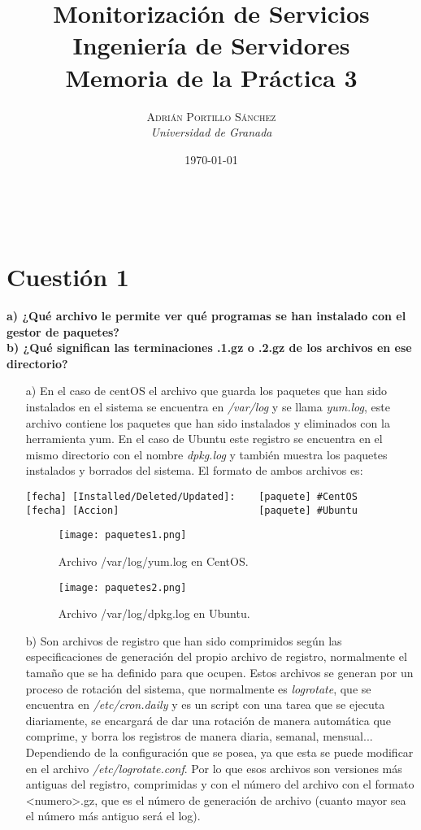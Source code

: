 \documentclass[a4paper, 11pt]{article} %
\title{\textbf{Monitorización de Servicios}\\ %
\vspace{20 pt}
Ingeniería de Servidores \\Memoria de la Práctica 3} %
\author{\textsc{Adrián Portillo Sánchez} %
\\{\textit{Universidad de Granada}}} %
\date{\today} %
\makeatletter
\renewcommand{\maketitle}{ %
\begin{center} %
{\Huge\@title} %
\end{center}

\vspace{20pt} %

\begin{flushright} %
{\large\@author} %
\\\@date %

\vspace{40pt} %
\end{flushright}
}
\makeatother
\begin{document}
\maketitle
\pagebreak
\tableofcontents
\pagebreak
\listoffigures
\pagebreak


\section{Cuestión 1}
\textbf{a) ¿Qué archivo le permite ver qué programas se han instalado con el gestor de paquetes?\\ b) ¿Qué significan las terminaciones .1.gz o .2.gz de los archivos en ese directorio?}\\ 

\begin{itemize}
\item[a)]\cite{1}\cite{2}En el caso de centOS el archivo que guarda los paquetes que han sido instalados en el sistema se encuentra en \textit{/var/log} y se llama \textit{yum.log}, este archivo contiene los paquetes que han sido instalados y eliminados con la herramienta yum. En el caso de Ubuntu este registro se encuentra en el mismo directorio con el nombre \textit{dpkg.log} y también muestra los paquetes instalados y borrados del sistema. El formato de ambos archivos es:
\begin{verbatim}
[fecha] [Installed/Deleted/Updated]:    [paquete] #CentOS
[fecha] [Accion]                        [paquete] #Ubuntu
\end{verbatim}

\begin{figure}[H]
\centering 
\texttt{[image: paquetes1.png]} 
\caption{Archivo /var/log/yum.log en CentOS.} 
\label{contexto:figura} 
\end{figure}

\begin{figure}[H]
\centering 
\texttt{[image: paquetes2.png]} 
\caption{Archivo /var/log/dpkg.log en Ubuntu.} 
\label{contexto:figura} 
\end{figure}


\item[b)] \cite{3} \cite{4} Son archivos de registro que han sido comprimidos según las especificaciones de generación del propio archivo de registro, normalmente el tamaño que se ha definido para que ocupen. Estos archivos se generan por un proceso de rotación del sistema, que normalmente es \textit{logrotate}, que se encuentra en \textit{/etc/cron.daily} y es un script con una tarea que se ejecuta diariamente, se encargará de dar una rotación de manera automática que comprime, y borra los registros de manera diaria, semanal, mensual... Dependiendo de la configuración que se posea, ya que esta se puede modificar en el archivo \textit{/etc/logrotate.conf}. Por lo que esos archivos son versiones más antiguas del registro, comprimidas y con el número del archivo con el formato <numero>.gz, que es el número de generación de archivo (cuanto mayor sea el número más antiguo será el log).
\end{itemize}
\end{document}
